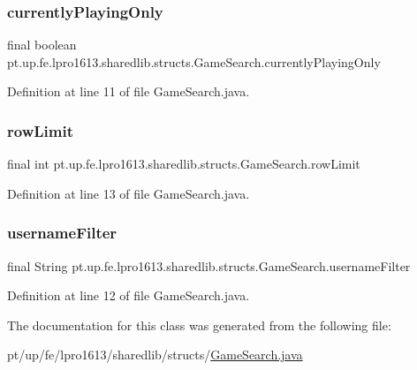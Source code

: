 \subsubsection{\texorpdfstring{currently\+Playing\+Only}{currentlyPlayingOnly}}
{\footnotesize\ttfamily final boolean pt.\+up.\+fe.\+lpro1613.\+sharedlib.\+structs.\+Game\+Search.\+currently\+Playing\+Only}



Definition at line 11 of file Game\+Search.\+java.

\hypertarget{classpt_1_1up_1_1fe_1_1lpro1613_1_1sharedlib_1_1structs_1_1_game_search_a700879797ed322ef8f064e6656622d5f}{}\label{classpt_1_1up_1_1fe_1_1lpro1613_1_1sharedlib_1_1structs_1_1_game_search_a700879797ed322ef8f064e6656622d5f} 
\subsubsection{\texorpdfstring{row\+Limit}{rowLimit}}
{\footnotesize\ttfamily final int pt.\+up.\+fe.\+lpro1613.\+sharedlib.\+structs.\+Game\+Search.\+row\+Limit}



Definition at line 13 of file Game\+Search.\+java.

\hypertarget{classpt_1_1up_1_1fe_1_1lpro1613_1_1sharedlib_1_1structs_1_1_game_search_af33050364c5b316349ab7a1fabce9206}{}\label{classpt_1_1up_1_1fe_1_1lpro1613_1_1sharedlib_1_1structs_1_1_game_search_af33050364c5b316349ab7a1fabce9206} 
\subsubsection{\texorpdfstring{username\+Filter}{usernameFilter}}
{\footnotesize\ttfamily final String pt.\+up.\+fe.\+lpro1613.\+sharedlib.\+structs.\+Game\+Search.\+username\+Filter}



Definition at line 12 of file Game\+Search.\+java.



The documentation for this class was generated from the following file\+:\begin{DoxyCompactItemize}
\item 
pt/up/fe/lpro1613/sharedlib/structs/\hyperlink{_game_search_8java}{Game\+Search.\+java}\end{DoxyCompactItemize}
